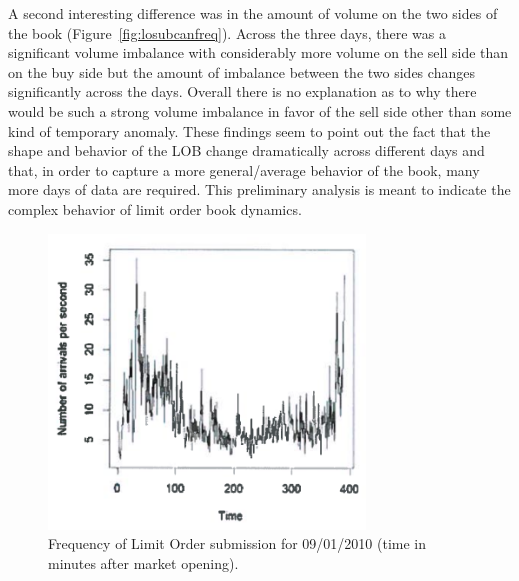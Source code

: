 A second interesting difference was in the amount of volume on the two sides of the book (Figure~\ref{fig:losubcanfreq}). Across the three days, there was a significant volume imbalance with considerably more volume on the sell side than on the buy side but the amount of imbalance between the two sides changes significantly across the days. Overall there is no explanation as to why there would be such a strong volume imbalance in favor of the sell side other than some kind of temporary anomaly. These findings seem to point out the fact that the shape and behavior of the LOB change dramatically across different days and that, in order to capture a more general/average behavior of the book, many more days of data are required. This preliminary analysis is meant to indicate the complex behavior of limit order book dynamics. \twomedskip
	\begin{figure}[!ht]
   	\centering
   	\includegraphics[width=0.75\textwidth]{chapters/chapter_trade_data_models/figures/freqsubmit.png} 
   	\caption{Frequency of Limit Order submission for 09/01/2010 (time in minutes after market opening). \label{fig:freqsubmit1}}
	\end{figure}
